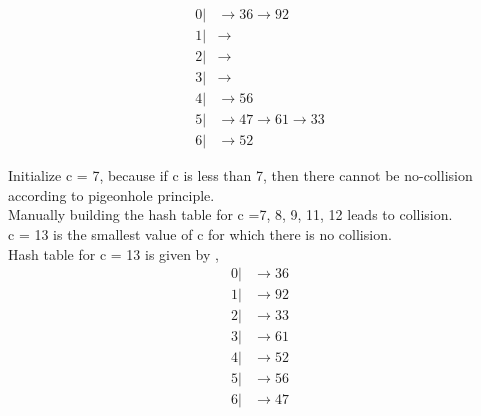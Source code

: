 \documentclass[12pt,twoside]{article}
\begin{document}


\begin{problems}

\problem  %

\begin{problemparts}
\problempart %
\begin{align*}
    0 | &\rightarrow 36 \rightarrow 92 \\
    1 | &\rightarrow  \\
    2 | &\rightarrow \\
    3 | &\rightarrow \\
    4 | &\rightarrow 56 \\
    5 | &\rightarrow 47 \rightarrow 61 \rightarrow 33 \\
    6 | &\rightarrow 52
\end{align*}


\problempart %
Initialize c = 7, because if c is less than 7, then there cannot be no-collision according to pigeonhole principle. \\
Manually building the hash table for c =7, 8, 9, 11, 12 leads to collision. \\
c = 13 is the smallest value of c for which there is no collision. \\
Hash table for c = 13 is given by , \\
\begin{align*}
    0 | &\rightarrow 36 \\
    1 | &\rightarrow 92\\
    2 | &\rightarrow 33\\
    3 | &\rightarrow 61\\
    4 | &\rightarrow 52 \\
    5 | &\rightarrow 56 \\
    6 | &\rightarrow 47
\end{align*}
\end{problemparts}

\newpage


\end{problems}
\end{document}
